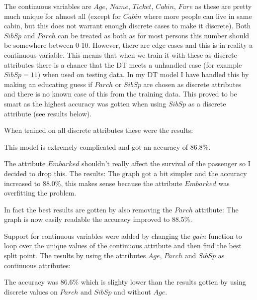 \documentclass[11pt, english]{../Template/NTNUoving}
\begin{document}
\begin{oppgave}
    \begin{punkt}
        The continuous variables are $Age$, $Name$, $Ticket$, $Cabin$, $Fare$ as these are pretty much
        unique for almost all (except for $Cabin$ where more people can live in same cabin, but this does not warrant enough discrete cases to make it discrete). Both $SibSp$ and $Parch$ can be treated as
        both as for most persons this number should be somewhere between 0-10. However, there are edge cases and this is in reality a continuous variable. This means that when we train it
        with these as discrete attributes there is a chance that the DT meets a unhandled case (for example $SibSp = 11$) when used on testing data.
        In my DT model I have handled this by making an educating guess if $Parch$ or $SibSp$ are chosen as discrete attributes and there is no known case of this from the
        training data. This proved to be smart as the highest accuracy was gotten when using $SibSp$ as a discrete attribute (see results below).

        When trained on all discrete attributes these were the results:
        \clearpage

        This model is extremely complicated and got an accuracy of 86.8\%.

        The attribute $Embarked$ shouldn't really affect the survival of the passenger so I decided to drop this. The results:
        \clearpage
        The graph got a bit simpler and the accuracy increased to 88.0\%, this makes sense because
        the attribute $Embarked$ was overfitting the problem.

        In fact the best results are gotten by also removing the $Parch$ attribute:
        \clearpage
        The graph is now easily readable the accuracy improved to 88.5\%.

    \end{punkt}

    \begin{punkt}
        Support for continuous variables were added by changing the $gain$ function to
        loop over the unique values of the continuous attribute and then find the best split point.
        The results by using the attributes $Age$, $Parch$ and $SibSp$ as continuous attributes:
        \clearpage

        The accuracy was 86.6\% which is slighty lower than the results gotten by using discrete values on
        $Parch$ and $SibSp$ and without $Age$.


\end{punkt}
\end{oppgave}
\end{document}
